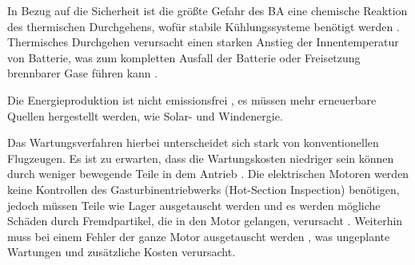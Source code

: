 In Bezug auf die Sicherheit ist die größte Gefahr des BA eine chemische Reaktion des thermischen Durchgehens, 
wofür stabile Kühlungssysteme benötigt werden \cite{donckers2024electric}. 
Thermisches Durchgehen verursacht einen starken Anstieg der Innentemperatur von Batterie, 
was zum kompletten Ausfall der Batterie oder Freisetzung brennbarer Gase führen kann \cite{shahid2022review}.


Die Energieproduktion ist nicht emissionsfrei \cite{abrantes2024impact}, 
es müssen mehr erneuerbare Quellen hergestellt werden, wie Solar- und Windenergie. 



Das Wartungsverfahren hierbei unterscheidet sich stark von konventionellen Flugzeugen. 
Es ist zu erwarten, dass die Wartungskosten niedriger sein können durch weniger bewegende Teile in dem Antrieb \cite{dalmia2022powering}. 
%
Die elektrischen Motoren werden keine Kontrollen des Gasturbinentriebwerks (Hot-Section Inspection) benötigen, 
jedoch müssen Teile wie Lager ausgetauscht werden und es werden mögliche Schäden 
durch Fremdpartikel, die in den Motor gelangen, verursacht \cite{reimers2018introduction}.
Weiterhin muss bei einem Fehler der ganze Motor ausgetauscht werden \cite{dalmia2022powering}, 
was ungeplante Wartungen und zusätzliche Kosten verursacht.

